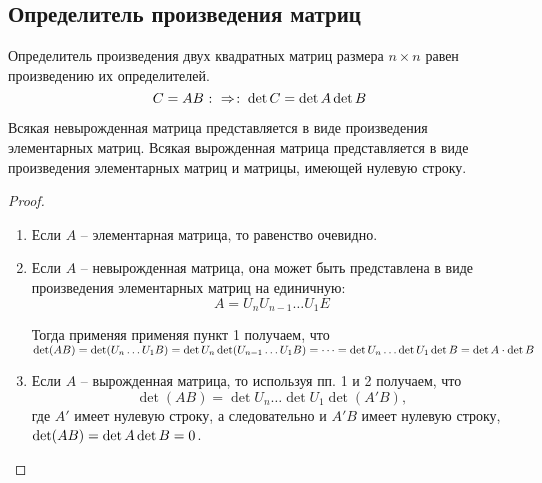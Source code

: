 \subsection{Определитель произведения матриц}
\label{matrixdet:mul}

\begin{theorem}
	Определитель произведения двух квадратных матриц размера $n\times n$
	равен произведению их определителей.
	$$C=AB \mathbin{\colon\Rightarrow \colon} \det C = \det A \det B$$
\end{theorem}

\begin{lemma}
  Всякая невырожденная матрица представляется в виде произведения элементарных матриц. Всякая вырожденная матрица представляется в виде произведения элементарных матриц и матрицы, имеющей нулевую строку.
\end{lemma}

\begin{proof}\par\strut\\
\begin{enumerate}
  \item Если $A$ -- элементарная матрица, то равенство очевидно.
  
  \item Если $A$ -- невырожденная матрица, она может быть представлена в виде произведения элементарных матриц на единичную:
  $$A=U_nU_{n-1}\dots U_1E$$
    
  Тогда применяя применяя пункт 1 получаем, что $\det(AB)=\det(U_n\dots U_1B)\bw=\det U_n\det(U_{n-1}\dots U_1B)=\dots =\det U_n \dots\det U_1 \det B=\det A\cdot\det B$
  
  \item Если $A$ -- вырожденная матрица, то используя пп. 1 и 2 получаем, что
  $$\det(AB)=\det U_n \dots\det U_1 \det(A'B),$$ где $A'$ имеет нулевую строку, а следовательно и $A'B$ имеет нулевую строку, $\det(AB)\bw=\det A\det B=0$.
\end{enumerate}
\end{proof}





